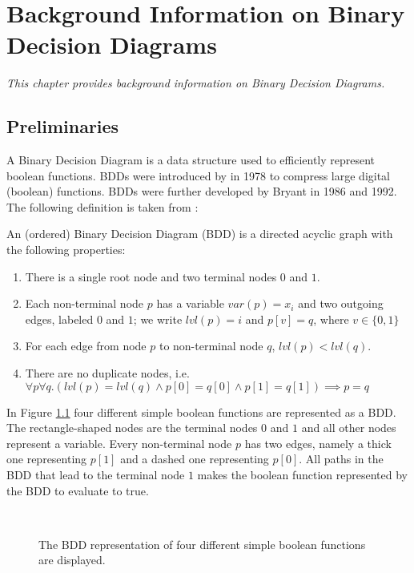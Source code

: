 \chapter{Background Information on Binary Decision Diagrams}

\textit{This chapter provides background information on Binary Decision Diagrams.}

\section{Preliminaries}
A Binary Decision Diagram is a data structure used to efficiently represent boolean functions. BDDs were introduced by \cite{akers1978binary} in 1978 to compress large digital (boolean) functions. BDDs were further developed by Bryant \cite{bryant1986graph, bryant1992symbolic} in 1986 and 1992. The following definition is taken from \cite{sylvan_multicore_bdd}:

\begin{definition}
	An (ordered) Binary Decision Diagram (BDD) is a directed acyclic graph with the following properties:
	\begin{enumerate}
		\item There is a single root node and two terminal nodes $0$ and $1$.
		\item Each non-terminal node $p$ has a variable $var(p) = x_i$ and two outgoing edges, labeled $0$ and $1$; we write $lvl(p) = i$ and $p[v] = q$, where $v \in \{ 0, 1 \}$
		\item For each edge from node $p$ to non-terminal node $q$, $lvl(p) < lvl(q)$.
		\item There are no duplicate nodes, i.e. $\forall p \forall q .(lvl(p) = lvl(q) \wedge p[0] = q[0] \wedge p[1] = q[1]) \implies p = q$
	\end{enumerate}
\end{definition}

In Figure \ref{fig:bdd_examples} four different simple boolean functions are represented as a BDD. The rectangle-shaped nodes are the terminal nodes $0$ and $1$ and all other nodes represent a variable. Every non-terminal node $p$ has two edges, namely a thick one representing $p[1]$ and a dashed one representing $p[0]$. All paths in the BDD that lead to the terminal node $1$ makes the boolean function represented by the BDD to evaluate to true.

\begin{figure}
	\centering
	\subfloat[$x$] {
		
		$\vspace{360pt}$
	}
	$\hspace{36pt}$
	\subfloat[$\neg x$] {
		
	}
	$\hspace{36pt}$
	\subfloat[$x_0 \wedge x_1$] {
		
	}
	$\hspace{36pt}$
	\subfloat[$x_0 \vee x_1$] {
		
	}
	
	\caption{The BDD representation of four different simple boolean functions are displayed.}
	\label{fig:bdd_examples}
\end{figure}


